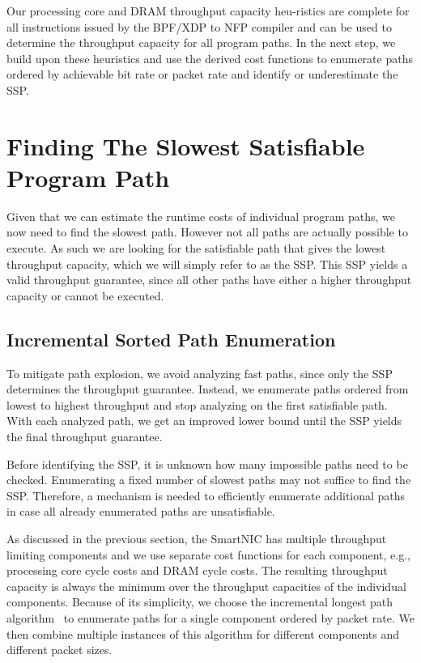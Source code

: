 \documentclass[sigconf,screen,authordraft]{acmart}
\newcommand{\eg}{e.g.,}
\begin{document}
Our processing core and DRAM throughput capacity heu-ristics are complete for all instructions issued by the BPF/XDP to \ac{NFP} compiler and can be used to determine the throughput capacity for all program paths.
In the next step, we build upon these heuristics and use the derived cost functions to enumerate paths ordered by achievable bit rate or packet rate and identify or underestimate the \acl{SSP}.


\section{Finding The Slowest Satisfiable Program Path}
\label{sec:path-enumeration}

Given that we can estimate the runtime costs of individual program paths, we now need to find the slowest path.
However not all paths are actually possible to execute.
As such we are looking for the satisfiable path that gives the lowest throughput capacity, which we will simply refer to as the \acf{SSP}.
This \ac{SSP} yields a valid throughput guarantee, since all other paths have either a higher throughput capacity or cannot be executed.


\subsection{Incremental Sorted Path Enumeration}
\label{subsec:path-enumeration}

To mitigate path explosion, we avoid analyzing fast paths, since only the \ac{SSP} determines the throughput guarantee.
Instead, we enumerate paths ordered from lowest to highest throughput and stop analyzing on the first satisfiable path.
With each analyzed path, we get an improved lower bound until the \ac{SSP} yields the final throughput guarantee.

Before identifying the \ac{SSP}, it is unknown how many impossible paths need to be checked.
Enumerating a fixed number of slowest paths may not suffice to find the \ac{SSP}.
Therefore, a mechanism is needed to efficiently enumerate additional paths in case all already enumerated paths are unsatisfiable.

As discussed in the previous section, the SmartNIC has multiple throughput limiting components and we use separate cost functions for each component, \eg{} processing core cycle costs and DRAM cycle costs.
The resulting throughput capacity is always the minimum over the throughput capacities of the individual components.
Because of its simplicity, we choose the incremental longest path algorithm~\cite{kundu94} to enumerate paths for a single component ordered by packet rate.
We then combine multiple instances of this algorithm for different components and different packet sizes.
\end{document}
